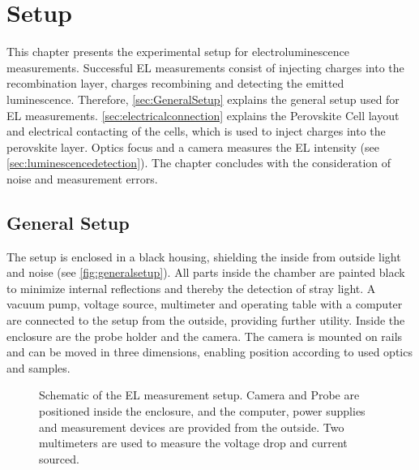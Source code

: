 \chapter{Setup}
This chapter presents the experimental setup for electroluminescence measurements. Successful EL measurements consist of injecting charges into the recombination layer, charges recombining and detecting the emitted luminescence. Therefore, \autoref{sec:GeneralSetup} explains the general setup used for EL measurements. \autoref{sec:electricalconnection} explains the Perovskite Cell layout and electrical contacting of the cells, which is used to inject charges into the perovskite layer. Optics focus and a camera measures the EL intensity (see \autoref{sec:luminescencedetection}). The chapter concludes with the consideration of noise and measurement errors.

\section{General Setup}\label{sec:GeneralSetup}
The setup is enclosed in a black housing, shielding the inside from outside light and noise (see \autoref{fig:generalsetup}). All parts inside the chamber are painted black to minimize internal reflections and thereby the detection of stray light. A vacuum pump, voltage source, multimeter and operating table with a computer are connected to the setup from the outside, providing further utility. Inside the enclosure are the probe holder and the camera. The camera is mounted on rails and can be moved in three dimensions, enabling position according to used optics and samples.
\begin{figure}[h]
	\centering
	
	\caption{Schematic of the EL measurement setup. Camera and Probe are positioned inside the enclosure, and the computer, power supplies and measurement devices are provided from the outside. Two multimeters are used to measure the voltage drop and current sourced.}
	\label{fig:generalsetup}
\end{figure}
